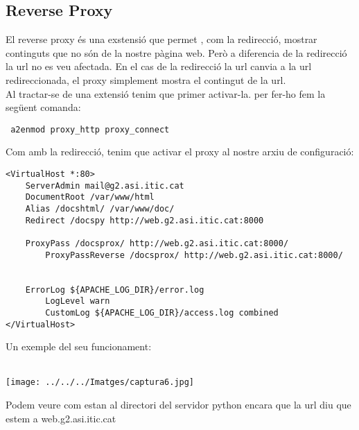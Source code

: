 \documentclass[11p]{article}
\begin{document}
\subsection{Reverse Proxy}
El reverse proxy és una exstensió que permet , com la redirecció, mostrar continguts que no són de la nostre pàgina web. Però a diferencia de la redirecció la url no es veu afectada. En el cas de la redirecció la url canvia a la url redireccionada, el proxy simplement mostra el contingut de la url.\\
Al tractar-se de una extensió tenim que primer activar-la. per fer-ho fem la següent comanda:
\begin{lstlisting}
 a2enmod proxy_http proxy_connect
\end{lstlisting}
Com amb la redirecció, tenim que activar el proxy al nostre arxiu de configuració:\\
\begin{lstlisting}
<VirtualHost *:80>
	ServerAdmin mail@g2.asi.itic.cat
	DocumentRoot /var/www/html     
	Alias /docshtml/ /var/www/doc/	
	Redirect /docspy http://web.g2.asi.itic.cat:8000 
	
	ProxyPass /docsprox/ http://web.g2.asi.itic.cat:8000/
    	ProxyPassReverse /docsprox/ http://web.g2.asi.itic.cat:8000/
	
	
	ErrorLog ${APACHE_LOG_DIR}/error.log
    	LogLevel warn
    	CustomLog ${APACHE_LOG_DIR}/access.log combined
</VirtualHost>
\end{lstlisting}
Un exemple del seu funcionament:\\\\
\centerline{\texttt{[image: ../../../Imatges/captura6.jpg]} }
Podem veure com estan al directori del servidor python encara que la url diu que estem a web.g2.asi.itic.cat
\end{document}
